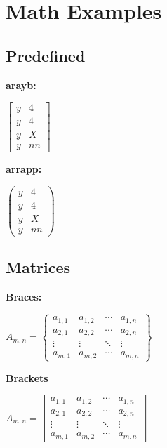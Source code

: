 \documentclass[11pt,a4paper,oneside]{article}
\newcommand{\parens} [1] {\left(  #1  \right)}
\newcommand{\brackets} [1] {\left[ #1 \right]}
\newcommand{\arrayp}[2]{\parens{ \begin{array}{#1}  #2 \end{array} } }
\newcommand{\arrayb}[2]{\brackets{ \begin{array}{#1}  #2 \end{array} } }
\begin{document}
\section{Math Examples}

\subsection{Predefined}
\bf{arayb:}
\begin{center}
	$\arrayb{c|c}{y & 4\\y & 4\\y & X\\y & nn}$\cite{STATODbook}
\end{center}


\noindent \bf{arrapp:}
\begin{center}
	$\arrayp{cc}{y & 4\\y & 4\\y & X\\y & nn}$
\end{center}




\subsection{Matrices}
\bf{Braces:}

\begin{center}
	$
		A_{m,n} =
		 \begin{Bmatrix}
		  a_{1,1} & a_{1,2} & \cdots & a_{1,n} \\
		  a_{2,1} & a_{2,2} & \cdots & a_{2,n} \\
		  \vdots  & \vdots  & \ddots & \vdots  \\
		  a_{m,1} & a_{m,2} & \cdots & a_{m,n}
		 \end{Bmatrix}
	$
\end{center}

\noindent \bf{Brackets}
\begin{center}
	$
		A_{m,n} =
		 \begin{bmatrix}
		  a_{1,1} & a_{1,2} & \cdots & a_{1,n} \\
		  a_{2,1} & a_{2,2} & \cdots & a_{2,n} \\
		  \vdots  & \vdots  & \ddots & \vdots  \\
		  a_{m,1} & a_{m,2} & \cdots & a_{m,n}
		 \end{bmatrix}
	$
\end{center}
\end{document}
